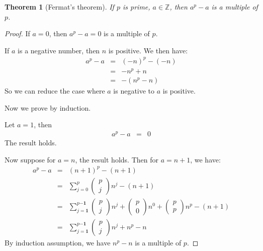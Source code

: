 \documentclass{article}
\theoremstyle{MyNonumberplain}
\theoremstyle{break}
\newtheorem*{proof}{Proof. }
\newcommand{\tmmathbf}[1]{\ensuremath{\boldsymbol{#1}}}
\theoremstyle{break}
\newtheorem{theorem}{Theorem}[section]
\theoremstyle{break}
\theoremstyle{definition}
\theoremstyle{break}
\begin{document}
\begin{thmbox}
    \begin{theorem}[Fermat's theorem]
        If $p$ is prime, $a \in \mathbb{Z}$, then $a^p - a$ is a multiple of $p$.
    \end{theorem}
    \begin{prfbox}
        \begin{proof}
            If $a = 0$, then $a^p - a = 0$ is a multiple of $p$.\bigskip

            If $a$ is a negative number, then $n$ is positive. We then have:
            \begin{eqnarray*}
              a^p - a & = & (- n)^p - (- n)\\
              & = & - n^p + n\\
              & = & - (n^p - n)
            \end{eqnarray*}
            So we can reduce the case where $a$ is negative to $a$ is positive.\bigskip
            
            Now we prove by induction.\bigskip
            
            Let $a = 1$, then
            \begin{eqnarray*}
              a^p - a & = & 0
            \end{eqnarray*}
            The result holds.\bigskip
            
            Now suppose for $a = n$, the result holds. Then for $a = n + 1$, we have:
            \begin{eqnarray}
              a^p - a & = & (n + 1)^p - (n + 1)\nonumber\\
              & = & \sum^p_{j = 0} \left(\begin{array}{c}
                p\\
                j
              \end{array}\right) n^j - (n + 1)\nonumber\\
              & = & \sum^{p \tmmathbf{- 1}}_{j = \tmmathbf{1}} \left(\begin{array}{c}
                p\\
                j
              \end{array}\right) n^j + \left(\begin{array}{c}
                p\\
                0
              \end{array}\right) n^0 + \left(\begin{array}{c}
                p\\
                p
              \end{array}\right) n^p - (n + 1)\nonumber\\
              & = & \sum^{p \tmmathbf{- 1}}_{j = \tmmathbf{1}} \left(\begin{array}{c}
                p\\
                j
              \end{array}\right) n^j + n^p - n
            \end{eqnarray}
            By induction assumption, we have $n^p - n$ is a multiple of $p$.\bigskip
            

\end{proof}
\end{prfbox}
\end{thmbox}
\end{document}
